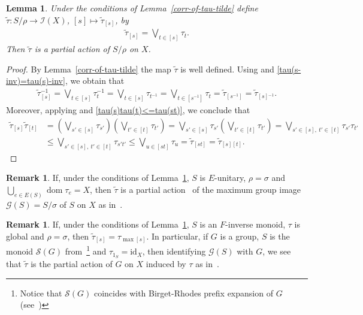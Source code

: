 \documentclass[reqno]{amsart}
\newtheorem{lem}[thrm]{Lemma}
\theoremstyle{definition}
\newtheorem{rem}[thrm]{Remark}
\newcommand{\id}{\mathrm{id}}
\newcommand{\cI}[1]{\mathcal I{(#1)}}
\newcommand{\cS}[1]{\mathcal S{(#1)}}
\newcommand{\cG}[1]{\mathcal G{(#1)}}
\newcommand{\dom}[1]{\operatorname{\mathrm{dom}}{#1}}
\newcommand{\m}{{}^{-1}}
\newcommand{\0}{\theta}
\newcommand{\tl}{\tilde}
\newcommand{\Jn}{\bigvee}
\begin{document}
\begin{lem}\label{tilde-tau-pact}
	Under the conditions of Lemma~\ref{corr-of-tau-tilde} define $\tl\tau:S/\rho\to\cI X$, $[s]\mapsto\tl\tau_{[s]}$, by
	\begin{align}\label{tl-tau-formula}
	\tl\tau_{[s]}=\Jn_{t\in[s]}\tau_t.
	\end{align}
	Then $\tl\tau$ is a partial action of $S/\rho$ on $X$.
\end{lem}
\begin{proof}
	By Lemma~\ref{corr-of-tau-tilde} the map $\tl\tau$ is well defined. Using \cite[Proposition 1.2.1 (4)]{Lawson} and \ref{tau(s-inv)=tau(s)-inv}, we obtain that
	\begin{align*}
	\tl\tau\m_{[s]}=\Jn_{t\in[s]}\tau\m_t=\Jn_{t\in[s]}\tau_{t\m}=\Jn_{t\in[s\m]}\tau_t=\tl\tau_{[s\m]}=\tl\tau_{[s]\m}.
	\end{align*}
	Moreover, applying \cite[Proposition 1.2.1 (5)]{Lawson} and \ref{tau(s)tau(t)<=tau(st)}, we conclude that
	\begin{align*}
	\tl\tau_{[s]}\tl\tau_{[t]}&=\left(\Jn_{s'\in[s]}\tau_{s'}\right)\left(\Jn_{t'\in[t]}\tau_{t'}\right)=\Jn_{s'\in[s]}\tau_{s'}\left(\Jn_{t'\in[t]}\tau_{t'}\right)=\Jn_{s'\in[s],\ t'\in[t]}\tau_{s'}\tau_{t'}\\
	&\le\Jn_{s'\in[s],\ t'\in[t]}\tau_{s't'}\le\Jn_{u\in[st]}\tau_u=\tl\tau_{[st]}=\tl\tau_{[s][t]}.
	\end{align*}
\end{proof}

\begin{rem}\label{S-E-unitary-rho=sigma}
	If, under the conditions of Lemma~\ref{tilde-tau-pact}, $S$ is $E$-unitary, $\rho=\sigma$ and $\bigcup_{e\in E(S)}\dom{\tau_e}=X$, then $\tl\tau$ is a partial action~\cite{E1,KL} of the maximum group image $\cG S=S/\sigma$ of $S$ on $X$  as in~\cite[Theorem 1.2]{St2001}. 
\end{rem}

\begin{rem}\label{S-F-inverse-rho=sigma}
	If, under the conditions of Lemma~\ref{tilde-tau-pact}, $S$ is an $F$-inverse monoid, $\tau$ is global and $\rho=\sigma$, then $\tl\tau_{[s]}=\tau_{\max[s]}$. In particular, if $G$ is a group, $S$ is the monoid $\cS G$ from~\cite{E1}\footnote{Notice that $\cS G$ coincides with Birget-Rhodes prefix expansion of $G$ (see~\cite{Birget-Rhodes89,Szendrei89})} and $\tau_{1_S}=\id _X$, then identifying $\cG S$ with $G$, we see that $\tl\tau$ is the partial action of $G$ on $X$ induced by $\tau$ as in~\cite[Theorem 4.2]{E1}.
\end{rem}
\end{document}
